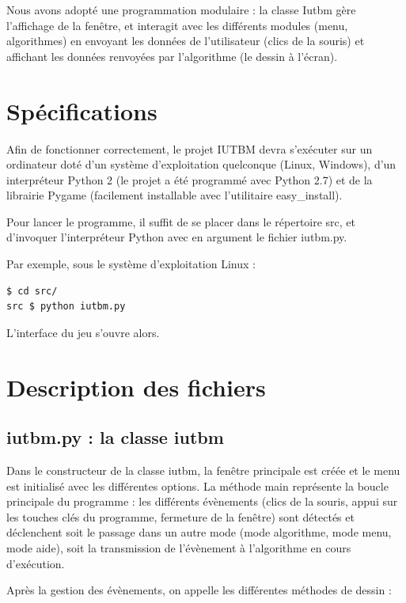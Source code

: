 \documentclass{scrreprt}
\begin{document}
Nous avons adopté une programmation modulaire : la classe Iutbm gère l'affichage de la
 fenêtre, et interagit avec les différents modules (menu, algorithmes) en envoyant les
 données de l'utilisateur (clics de la souris) et affichant les données renvoyées par
 l'algorithme (le dessin à l'écran).

\tableofcontents

\chapter{Spécifications}

Afin de fonctionner correctement, le projet IUTBM devra s'exécuter sur un ordinateur doté
 d'un système d'exploitation quelconque (Linux, Windows), d'un interpréteur Python 2
 (le projet a été programmé avec Python 2.7) et de la librairie Pygame (facilement
 installable avec l'utilitaire easy\_install).

Pour lancer le programme, il suffit de se placer dans le répertoire src, et d'invoquer
 l'interpréteur Python avec en argument le fichier iutbm.py.

Par exemple, sous le système d'exploitation Linux :

\begin{verbatim}
$ cd src/
src $ python iutbm.py
\end{verbatim}

L'interface du jeu s'ouvre alors.

\chapter{Description des fichiers}

\section{iutbm.py : la classe iutbm}

Dans le constructeur de la classe iutbm, la fenêtre principale est créée et le menu est
 initialisé avec les différentes options. La méthode main représente la boucle principale
 du programme : les différents évènements (clics de la souris, appui sur les touches clés
 du programme, fermeture de la fenêtre) sont détectés et déclenchent soit le passage
 dans un autre mode (mode algorithme, mode menu, mode aide), soit la transmission
 de l'évènement à l'algorithme en cours d'exécution.

Après la gestion des évènements, on appelle les différentes méthodes de dessin :
\end{document}
